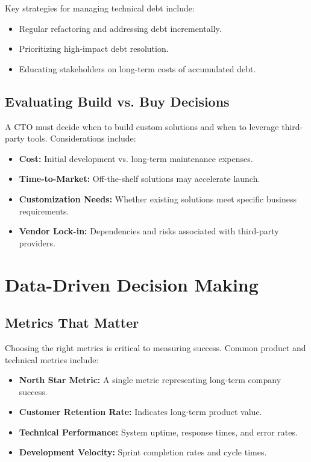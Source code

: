 Key strategies for managing technical debt include:

\begin{itemize}
    \item Regular refactoring and addressing debt incrementally.
    \item Prioritizing high-impact debt resolution.
    \item Educating stakeholders on long-term costs of accumulated debt.
\end{itemize}

\subsection{Evaluating Build vs. Buy Decisions}
A CTO must decide when to build custom solutions and when to leverage third-party tools. Considerations include:

\begin{itemize}
    \item \textbf{Cost:} Initial development vs. long-term maintenance expenses.
    \item \textbf{Time-to-Market:} Off-the-shelf solutions may accelerate launch.
    \item \textbf{Customization Needs:} Whether existing solutions meet specific business requirements.
    \item \textbf{Vendor Lock-in:} Dependencies and risks associated with third-party providers.
\end{itemize}

\section{Data-Driven Decision Making}

\subsection{Metrics That Matter}
Choosing the right metrics is critical to measuring success. Common product and technical metrics include:

\begin{itemize}
    \item \textbf{North Star Metric:} A single metric representing long-term company success.
    \item \textbf{Customer Retention Rate:} Indicates long-term product value.
    \item \textbf{Technical Performance:} System uptime, response times, and error rates.
    \item \textbf{Development Velocity:} Sprint completion rates and cycle times.
\end{itemize}

